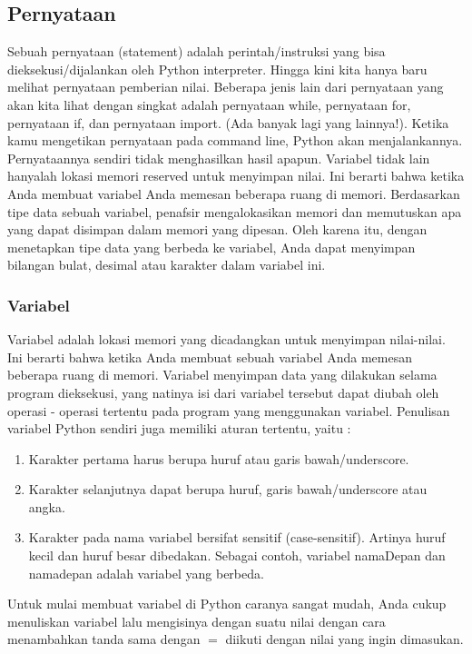 \subsection{Pernyataan}
	Sebuah pernyataan (statement) adalah perintah/instruksi yang bisa dieksekusi/dijalankan oleh Python interpreter. Hingga kini kita hanya baru melihat pernyataan pemberian nilai. Beberapa jenis lain dari pernyataan yang akan kita lihat dengan singkat adalah pernyataan  while, pernyataan for, pernyataan if, dan pernyataan import. (Ada banyak lagi yang lainnya!).
Ketika kamu mengetikan pernyataan pada command line, Python akan menjalankannya. Pernyataannya sendiri tidak menghasilkan hasil apapun. 
Variabel tidak lain hanyalah lokasi memori reserved untuk menyimpan nilai. Ini berarti bahwa ketika Anda membuat variabel Anda memesan beberapa ruang di memori.
Berdasarkan tipe data sebuah variabel, penafsir mengalokasikan memori dan memutuskan apa yang dapat disimpan dalam memori yang dipesan. Oleh karena itu, dengan menetapkan tipe data yang berbeda ke variabel, Anda dapat menyimpan bilangan bulat, desimal atau karakter dalam variabel ini.

\subsubsection{Variabel}
	Variabel adalah lokasi memori yang dicadangkan untuk menyimpan nilai-nilai. Ini berarti bahwa ketika Anda membuat sebuah variabel Anda memesan beberapa ruang di memori. Variabel menyimpan data yang dilakukan selama program dieksekusi, yang natinya isi dari variabel tersebut dapat diubah oleh operasi - operasi tertentu pada program yang menggunakan variabel.
Penulisan variabel Python sendiri juga memiliki aturan tertentu, yaitu : 
\begin{enumerate}
	\item Karakter pertama harus berupa huruf atau garis bawah/underscore.
 	\item Karakter selanjutnya dapat berupa huruf, garis bawah/underscore atau angka.
	\item Karakter pada nama variabel bersifat sensitif (case-sensitif). Artinya huruf kecil dan huruf besar dibedakan. 
	Sebagai contoh, variabel namaDepan dan namadepan adalah variabel yang berbeda.
\end{enumerate}
Untuk mulai membuat variabel di Python caranya sangat mudah, Anda cukup menuliskan variabel lalu mengisinya dengan suatu nilai dengan cara menambahkan tanda sama dengan \(=\) diikuti dengan nilai yang ingin dimasukan. 

